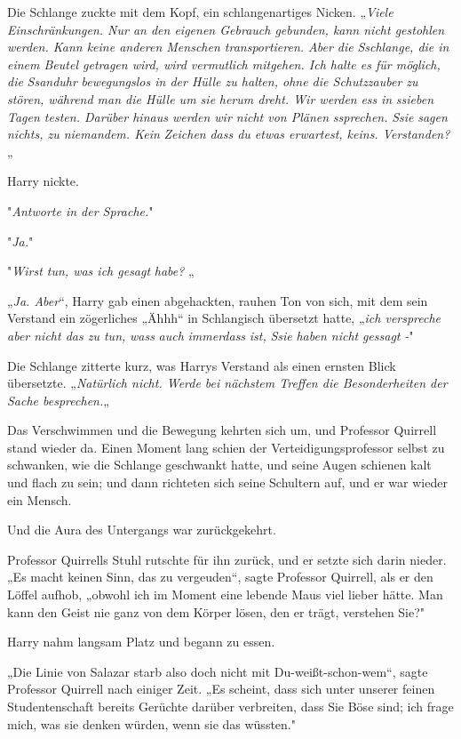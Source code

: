 {Die Schlange zuckte mit dem Kopf, ein schlangenartiges Nicken. „\emph{Viele Einschränkungen. Nur an den eigenen Gebrauch gebunden, kann nicht gestohlen werden. Kann keine anderen Menschen transportieren. Aber die} \emph{Sschlange, die in einem Beutel getragen wird, wird vermutlich mitgehen. Ich halte es für möglich, die} \emph{Ssanduhr} \emph{bewegungslos in der Hülle zu halten, ohne die Schutzzauber zu stören, während man die Hülle um sie} \emph{herum dreht. Wir werden} \emph{ess} \emph{in} \emph{ssieben} \emph{Tagen testen. Darüber hinaus werden wir nicht von Plänen} \emph{ssprechen.} \emph{Ssie} \emph{sagen nichts, zu niemandem. Kein} \emph{Zeichen} \emph{dass du etwas erwartest, keins. Verstanden?} „

Harry nickte.

"\emph{Antworte in der Sprache.}"

"\emph{Ja.}"

"\emph{Wirst tun, was ich gesagt} \emph{habe?} „

„\emph{Ja. Aber}“, Harry gab einen abgehackten, rauhen Ton von sich, mit dem sein Verstand ein zögerliches „Ähhh“ in Schlangisch übersetzt hatte, „\emph{ich verspreche aber nicht das zu tun,} \emph{wass} \emph{auch} \emph{immerdass} \emph{ist,} \emph{Ssie} \emph{haben nicht} \emph{gessagt} \emph{-}"

Die Schlange zitterte kurz, was Harrys Verstand als einen ernsten Blick übersetzte. „\emph{Natürlich nicht. Werde bei nächstem Treffen die Besonderheiten der Sache besprechen.}„

Das Verschwimmen und die Bewegung kehrten sich um, und Professor Quirrell stand wieder da. Einen Moment lang schien der Verteidigungsprofessor selbst zu schwanken, wie die Schlange geschwankt hatte, und seine Augen schienen kalt und flach zu sein; und dann richteten sich seine Schultern auf, und er war wieder ein Mensch.

Und die Aura des Untergangs war zurückgekehrt.

Professor Quirrells Stuhl rutschte für ihn zurück, und er setzte sich darin nieder. „Es macht keinen Sinn, das zu vergeuden“, sagte Professor Quirrell, als er den Löffel aufhob, „obwohl ich im Moment eine lebende Maus viel lieber hätte. Man kann den Geist nie ganz von dem Körper lösen, den er trägt, verstehen Sie?"

Harry nahm langsam Platz und begann zu essen.

„Die Linie von Salazar starb also doch nicht mit Du-weißt-schon-wem“, sagte Professor Quirrell nach einiger Zeit. „Es scheint, dass sich unter unserer feinen Studentenschaft bereits Gerüchte darüber verbreiten, dass Sie Böse sind; ich frage mich, was sie denken würden, wenn sie das wüssten."

}
